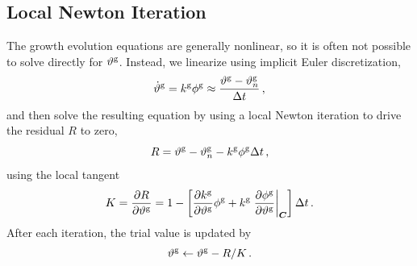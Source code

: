 \documentclass[10pt,letterpaper,oneside]{report}
\newcommand{\scas}[1]{\mbox{{\scriptsize{${\rm{#1}}$}}}{}}
\newcommand{\tens}[1]{\mbox{\boldmath{\scriptsize{$#1$}}}{}}
\begin{document}
\begin{itemize}
\subsection{Local Newton Iteration}
\label{subsec:local_newton}
The growth evolution equations are generally nonlinear, so it is often not possible to solve directly for $\vartheta^{\scas{g}}$.  Instead, we linearize using implicit Euler discretization, 
\begin{equation}
\dot{\vartheta}^{\scas{g}} = k^{\scas{g}} \phi^{\scas{g}} \approx{} \frac{\vartheta^{\scas{g}} - \vartheta^{\scas{g}}_n }{\Delta t} \, , 
\end{equation}
and then solve the resulting equation by using a local Newton iteration to drive the residual $R$ to zero, 
\begin{equation}
R = \vartheta^{\scas{g}} - \vartheta^{\scas{g}}_n - k^{\scas{g}} \phi^{\scas{g}} \Delta t \, , 
\end{equation}
using the local tangent 
\begin{equation}
K = \frac{\partial R}{\partial \vartheta^{\scas{g}} } = 1 - \left[ \frac{\partial k^{\scas{g}}}{\partial \vartheta^{\scas{g}} } \phi^{\scas{g}} + k^{\scas{g}} \left. \frac{\partial \phi^{\scas{g}} }{\partial \vartheta^{\scas{g}} } \right|_{\tens{C}} \right] \Delta t \, . 
\end{equation}
After each iteration, the trial value is updated by
\begin{equation}
\vartheta^{\scas{g}} \leftarrow \vartheta^{\scas{g}} - R / K \, .  
\end{equation}



\end{itemize}
\end{document}
